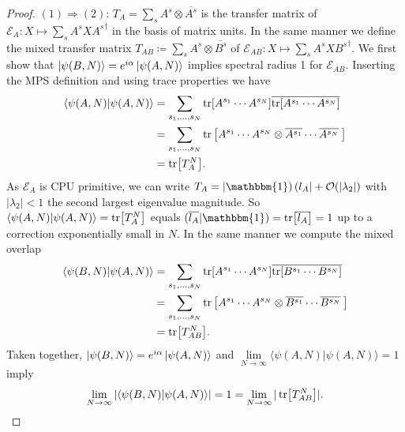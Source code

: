 \begin{proof}
\noindent $(1) \Rightarrow (2)$: $T_A = \sum_s A^s \otimes \overline{A^s}$ is the transfer matrix of $\mathcal{E}_A: X \mapsto \sum_s A^s X {A^s}^{\dagger}$ in the basis of matrix units. In the same manner we define the mixed transfer matrix $T_{AB} \coloneqq \sum_s A^s \otimes \overline{B^s}$ of $\mathcal{E}_{AB}: X \mapsto \sum_s A^s X {B^s}^{\dagger}$. We first show that $\ket{\psi(B,N)} = e^{i \alpha} \ket{\psi(A,N)}$ implies spectral radius 1 for $\mathcal{E}_{AB}$. Inserting the MPS definition and using trace properties we have
\begin{align}
\begin{split}
	\langle \psi(A,N) \vert \psi(A,N) \rangle &= \sum_{s_1, \ldots, s_N} \tr[A^{s_1} \cdots A^{s_N}] \overline{\tr[A^{s_1} \cdots A^{s_N}]} \\
	&= \sum_{s_1, \ldots, s_N} \tr\left[A^{s_1} \cdots A^{s_N} \otimes \overline{A^{s_1}} \cdots \overline{A^{s_N}}\:\right] \\
	&= \tr[T_A^N].
\end{split}
\end{align}
As $\mathcal{E}_A$ is CPU primitive, we can write $T_A = \tket{\mathbbm{1}} \tbra{l_A} + \mathcal{O}(\vert \lambda_2 \vert)$ with $\vert \lambda_2 \vert < 1$ the second largest eigenvalue magnitude. So $\langle \psi(A,N) \vert \psi(A,N) \rangle = \tr[T_A^N]$ equals  $( \overline{l_A} \vert \mathbbm{1} ) = \tr[\overline{l_A}] = 1$ up to a correction exponentially small in $N$. In the same manner we compute the mixed overlap
\begin{align}
\begin{split}
	\langle \psi(B,N) \vert \psi(A,N) \rangle &= \sum_{s_1, \ldots, s_N} \tr[A^{s_1} \cdots A^{s_N}]\overline{\tr[B^{s_1} \cdots B^{s_N}]} \\
	&= \sum_{s_1, \ldots, s_N} \tr\left[A^{s_1} \cdots A^{s_N} \otimes \overline{B^{s_1}} \cdots \overline{B^{s_N}}\:\right] \\
	&= \tr[T_{AB}^N].
\end{split}
\end{align}
Taken together, $\ket{\psi(B,N)} = e^{i \alpha} \ket{\psi(A,N)}$ and $\lim\limits_{N \to \infty} \langle \psi(A,N) \vert \psi(A,N) \rangle = 1$ imply 
\begin{equation}
	\lim\limits_{N \to \infty} \vert \langle \psi(B,N) \vert \psi(A,N) \rangle \vert = 1 = \lim\limits_{N \to \infty} \vert \tr[T_{AB}^N] \vert.
\end{equation}


\end{proof}
